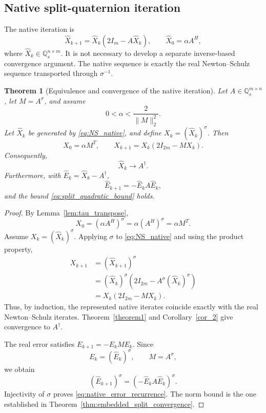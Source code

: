 \documentclass[12pt,a4paper]{article}
\theoremstyle{plain}
\newtheorem{theorem}{Theorem}[section]
\theoremstyle{definition}
\theoremstyle{remark}
\begin{document}
\subsection{Native split-quaternion iteration}
The native iteration is
\begin{equation} \label{eq:NS_native}
    \widehat X_{k+1} =\widehat X_k(2I_m-A\widehat X_k), \qquad \widehat X_0=\alpha A^H,
\end{equation}
where \(\widehat X_k\in\mathbb{Q}_s^{n\times m}\). It is not necessary to develop a separate inverse-based convergence argument. The native sequence is exactly the real Newton--Schulz sequence transported through \(\sigma^{-1}\).

\begin{theorem}[Equivalence and convergence of the native iteration] \label{thm:native_equivalence}
Let \(A\in\mathbb{Q}_s^{m\times n}\), let \(M=A^\sigma\), and assume
\[
    0<\alpha<\frac{2}{\|M\|_2^2}.
\]
Let \(\widehat X_k\) be generated by \eqref{eq:NS_native}, and define \(X_k=(\widehat X_k)^\sigma\). Then
\[
    X_0=\alpha M^T, \qquad X_{k+1}=X_k(2I_{2m}-MX_k).
\]
Consequently,
\[
    \widehat X_k\longrightarrow A^\dagger.
\]
Furthermore, with \(\widehat E_k=\widehat X_k-A^\dagger\),
\begin{equation}\label{eq:native_error_recurrence}
    \widehat E_{k+1}=-\widehat E_kA\widehat E_k,
\end{equation}
and the bound \eqref{eq:split_quadratic_bound} holds.
\end{theorem}

\begin{proof}
By Lemma~\ref{lem:tau_transpose},
\[
    X_0=(\alpha A^H)^\sigma =\alpha(A^H)^\sigma =\alpha M^T.
\]
Assume \(X_k=(\widehat X_k)^\sigma\). Applying \(\sigma\) to \eqref{eq:NS_native} and using the product property,
\begin{align*}
    X_{k+1}
    &=(\widehat X_{k+1})^\sigma\\
    &=(\widehat X_k)^\sigma
    \left(2I_{2m}-A^\sigma(\widehat X_k)^\sigma\right)\\
    &=X_k(2I_{2m}-MX_k).
\end{align*}
Thus, by induction, the represented native iterates coincide exactly with the real Newton--Schulz iterates. Theorem~\ref{theorem1} and Corollary~\ref{cor_2} give convergence to \(A^\dagger\).

The real error satisfies \(E_{k+1}=-E_kME_k\). Since
\[
    E_k=(\widehat E_k)^\sigma, \qquad M=A^\sigma,
\]
we obtain
\[
    (\widehat E_{k+1})^\sigma = (-\widehat E_kA\widehat E_k)^\sigma.
\]
Injectivity of \(\sigma\) proves \eqref{eq:native_error_recurrence}. The norm bound is the one established in Theorem~\ref{thm:embedded_split_convergence}.
\end{proof}
\end{document}
